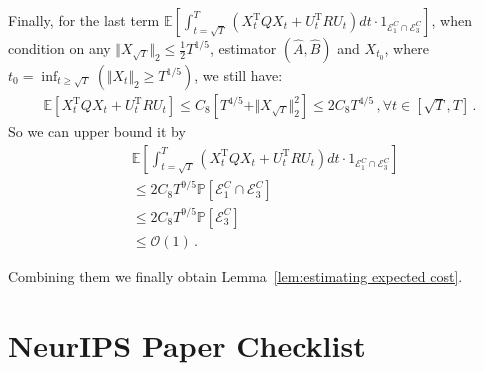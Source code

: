 \documentclass{article}
\theoremstyle{definition}
\begin{document}
Finally, for the last term $\mathbb{E}\left[\int_{t=\sqrt{T}}^{T}\left(X^{\mathrm{T}}_{t}QX_{t}+U^{\mathrm{T}}_{t}RU_{t}\right)dt\cdot1_{\mathcal{E}^{C}_{1}\cap\mathcal{E}^{C}_{3}} \right]$, when condition on any $\Vert X_{\sqrt{T}}\Vert_{2}\leq \frac{1}{2}T^{1/5}$, estimator $(\hat{A},\hat{B})$ and $X_{t_{0}}$, where $t_{0}=\inf_{t\geq \sqrt{T}}(\Vert X_{t}\Vert_{2}\geq T^{1/5})$, we still have:
\begin{align*}
\mathbb{E}\left[X^{\mathrm{T}}_{t}QX_{t}+U^{\mathrm{T}}_{t}RU_{t}\right]\leq C_{8}\left[T^{4/5}+\Vert X_{\sqrt{T}}\Vert^{2}_{2}\right]\leq 2C_{8}T^{4/5}\,, \forall t\in[\sqrt{T},T]\,.
\end{align*}
So we can upper bound it by
\begin{align*}
&\mathbb{E}\left[\int_{t=\sqrt{T}}^{T}\left(X^{\mathrm{T}}_{t}QX_{t}+U^{\mathrm{T}}_{t}RU_{t}\right)dt\cdot1_{\mathcal{E}^{C}_{1}\cap\mathcal{E}^{C}_{3}}\right]\\
&\leq 2C_{8}T^{9/5}\mathbb{P}\left[\mathcal{E}^{C}_{1}\cap\mathcal{E}^{C}_{3}\right]\\
&\leq 2C_{8}T^{9/5}\mathbb{P}[\mathcal{E}^{C}_{3}]\\
&\leq \mathcal{O}(1)\,.
\end{align*}

Combining them we finally obtain Lemma~\ref{lem:estimating expected cost}. 



\newpage
\section*{NeurIPS Paper Checklist}
\end{document}
